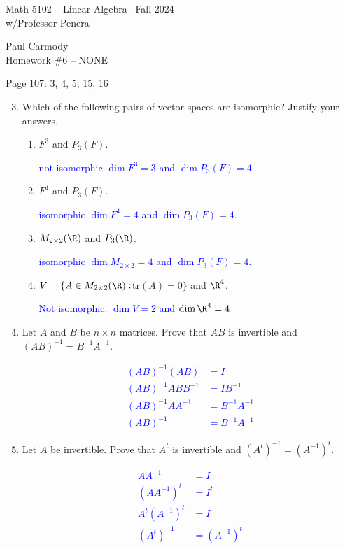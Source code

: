 \documentclass[10pt,a4paper]{report}
\newcommand{\CLASSNAME}{Math 5102 -- Linear Algebra}
\newcommand{\STUDENTNAME}{Paul Carmody}
\newcommand{\ASSIGNMENT}{Homework \#6 }
\newcommand{\DUEDATE}{NONE}
\newcommand{\SEMESTER}{Fall 2024}
\newcommand{\BLUE}[1]{\textcolor{blue}{#1}}
\begin{document}
\begin{center}
	\Large{\CLASSNAME -- \SEMESTER} \\
	\large{ w/Professor Penera}
\end{center}
\begin{center}
	\STUDENTNAME \\
	\ASSIGNMENT -- \DUEDATE\\
\end{center} 
Page 107: 3, 4, 5, 15, 16

\begin{enumerate}[label=Page 107:\arabic*.]
	\setcounter{enumi}{2}
	\item Which of the following pairs of vector spaces are isomorphic?  Justify your answers.
	\begin{enumerate}[label=(\alph*)]
		\item $F^3$ and $P_3(F)$.
		
		\BLUE{not isomorphic $\dim F^3 = 3$ and $\dim P_3(F) = 4$.}
		
		\item $F^4$ and $P_3(F)$.
		
		\BLUE{isomorphic $\dim F^4 = 4$ and $\dim P_3(F) = 4$.}
		
		\item $M_{2\times 2}(\R)$ and $P_3(\R)$.
		
		\BLUE{isomorphic $\dim M_{2\times 2} = 4$ and $\dim P_3(F) = 4$.}
		
		\item $V=\{A \in M_{2\times 2}(\R): $tr$(A) = 0\}$ and $\R^4$.	
		
		\BLUE{Not isomorphic.  $\dim V = 2$ and $\dim \R^4 = 4$}
	\end{enumerate}
	\item Let $A$ and $B$ be $n \times n$ matrices.  Prove that $AB$ is invertible and $(AB)^{-1} = B^{-1}A^{-1}$.
	
	\BLUE{\begin{align*}
		(AB)^{-1}(AB) &= I \\
		(AB)^{-1}ABB^{-1} &= IB^{-1} \\
		(AB)^{-1}AA^{-1} &= B^{-1}A^{-1} \\
		(AB)^{-1} &= B^{-1}A^{-1} 
	\end{align*}
	}
	
	\item Let $A$ be invertible. Prove that $A^t$ is invertible and $(A^t)^{-1} = (A^{-1})^t$.
	
	\BLUE{\begin{align*}
		AA^{-1} &= I \\
		(AA^{-1})^t &= I^t \\
		A^t(A^{-1})^t &= I \\
		(A^t)^{-1} &= (A^{-1})^t
	\end{align*}
	}
	

\end{enumerate}
\end{document}
